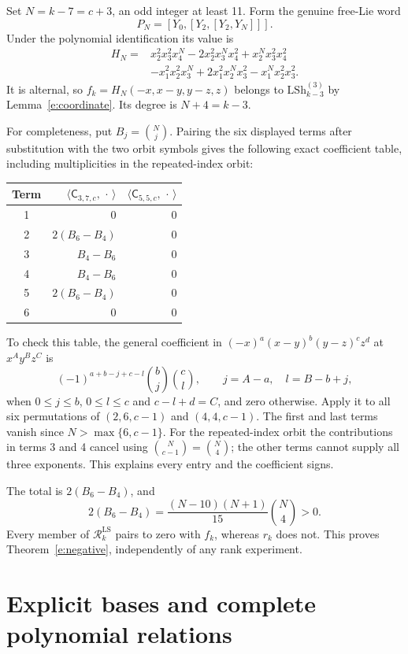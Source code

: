 \documentclass[12pt]{amsart}
\theoremstyle{definition}
\theoremstyle{remark}
\numberwithin{equation}{section}
\newcommand{\LS}{\mathrm{LSh}}
\newcommand{\RR}{\mathcal R^{\mathrm{LS}}}
\newcommand{\fC}[3]{\mathsf C_{#1,#2,#3}}
\numberwithin{equation}{section}
\begin{document}
Set $N=k-7=c+3$, an odd integer at least 11. Form the genuine free-Lie word
\[
 P_N=[Y_0,[Y_2,[Y_2,Y_N]]].
\]
Under the polynomial identification its value is
\begin{align*}
 H_N={}&x_2^2x_3^2x_4^N-2x_2^2x_3^Nx_4^2+x_2^Nx_3^2x_4^2\\
       &-x_1^2x_2^2x_3^N+2x_1^2x_2^Nx_3^2-x_1^Nx_2^2x_3^2.
\end{align*}
It is alternal, so $f_k=H_N(-x,x-y,y-z,z)$ belongs to $\LS_{k-3}^{(3)}$
by Lemma~\ref{e:coordinate}. Its degree is $N+4=k-3$.

For completeness, put $B_j=\binom Nj$. Pairing the six displayed terms
after substitution with the two orbit symbols gives the following exact
coefficient table, including multiplicities in the repeated-index orbit:
\begin{center}
\begin{tabular}{crr}\toprule
Term & $\langle\fC{3}{7}{c},\,\cdot\,\rangle$
     & $\langle\fC{5}{5}{c},\,\cdot\,\rangle$\\\midrule
1 & $0$ & $0$\\
2 & $2(B_6-B_4)$ & $0$\\
3 & $B_4-B_6$ & $0$\\
4 & $B_4-B_6$ & $0$\\
5 & $2(B_6-B_4)$ & $0$\\
6 & $0$ & $0$\\\bottomrule
\end{tabular}\end{center}
To check this table, the general coefficient in
$(-x)^a(x-y)^b(y-z)^cz^d$ at $x^Ay^Bz^C$ is
\begin{equation}\label{e:binomcoeff}
 (-1)^{a+b-j+c-l}\binom bj\binom cl,
 \qquad j=A-a,\quad l=B-b+j,
\end{equation}
when $0\le j\le b$, $0\le l\le c$ and $c-l+d=C$, and zero otherwise.
Apply it to all six permutations of $(2,6,c-1)$ and $(4,4,c-1)$.
The first and last terms vanish since $N>\max\{6,c-1\}$.
For the repeated-index orbit the contributions in terms 3 and 4 cancel
using $\binom N{c-1}=\binom N4$; the other terms cannot supply all three
exponents. This explains every entry and the coefficient signs.

The total is $2(B_6-B_4)$, and
\[
 2(B_6-B_4)=\frac{(N-10)(N+1)}{15}\binom N4>0.
\]
Every member of $\RR_k$ pairs to zero with $f_k$, whereas $r_k$ does not.
This proves Theorem~\ref{e:negative}, independently of any rank experiment.

\section{Explicit bases and complete polynomial relations}
\end{document}
